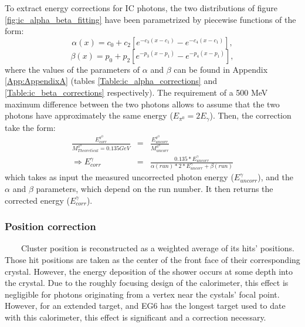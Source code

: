  To extract energy corrections for IC photons, the two distributions of figure \ref{fig:ic_alpha_beta_fitting} have been parametrized by piecewise functions of the form:
\begin{equation}
\alpha (x) = c_{0} + c_{2} \left[ e^{-c_{3}(x - c_{1})} - e^{-c_{4}(x - c_{1})} \right],
\end{equation}
\begin{equation}
\beta (x) = p_{0} + p_{2} \left[ e^{-p_{3}(x - p_{1})} - e^{-p_{4}(x - p_{1})} \right],
\end{equation}
where the values of the parameters of $\alpha$ and $\beta$ can be found in Appendix \ref{App:AppendixA} (tables \ref{Table:ic_alpha_corrections} and \ref{Table:ic_beta_corrections} respectively). The requirement of a 500 MeV maximum difference between the two photons allows to assume that the two photons have approximately the same energy ($E_{\pi^{0}} = 2 E_{\gamma}$). Then, the correction take the form:
\begin{eqnarray}
\frac{E^{\pi^{0}}_{corr}}{M^{\pi^{0}}_{Theoretical} = 0.135 GeV} &=& \frac{E^{\pi^{0}}_{uncorr}}{M^{\pi^{0}}_{uncorr}}\\ 
\Longrightarrow
E^{\gamma}_{corr} &=& \frac{0.135*E^{\gamma}_{uncorr}}{\alpha(run)*2*E^{\gamma}_{uncorr} + \beta(run)}
\label{ic_corrrection_formula}
\end{eqnarray}
which takes as input the measured uncorrected photon energy ($E^{\gamma}_{uncorr}$), and the $\alpha$ and $\beta$ parameters, which depend on the run number. It then returns the corrected energy ($E^{\gamma}_{corr}$).\\

\subsubsection{Position correction}
~~~~Cluster position is reconstructed as a weighted average of its hits' positions.  Those hit positions are taken as the center of the front face of their corresponding crystal.  However, the energy deposition of the shower occurs at some depth into the crystal.  Due to the roughly focusing design of the calorimeter, this effect is negligible for photons originating from a vertex near the cystals' focal point.  However, for an extended target, and EG6 has the longest target used to date with this calorimeter, this effect is significant and a correction necessary.

